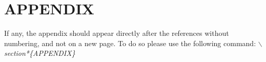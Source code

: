\documentclass[a4paper,twoside]{article}
\begin{document}

{\small
}


\section*{\uppercase{Appendix}}

If any, the appendix should appear directly after the references without numbering, and not on a new page. To do so please use the following command: \textit{$\backslash$section*\{APPENDIX\}}
\end{document}
